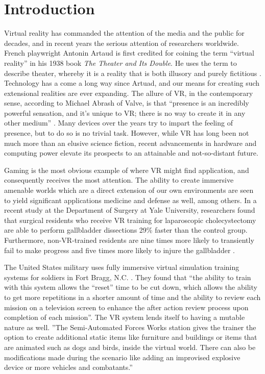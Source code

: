 \section{Introduction}
\label{sec:introduction}

Virtual reality has commanded the attention of the media and the public for
decades, and in recent years the serious attention of researchers worldwide.
French playwright Antonin Artaud is first credited for coining the term
``virtual reality'' in his 1938 book \emph{The Theater and Its Double}. He uses
the term to describe theater, whereby it is a reality that is both illusory and
purely fictitious \cite{website:popularizeVR}. Technology has a come a long way
since Artuad, and our means for creating such extensional realities are ever
expanding. The allure of VR, in the contemporary sense, according to Michael
Abrash of Valve, is that ``presence is an incredibly powerful sensation, and
it's unique to VR; there is no way to create it in any other medium''
\cite{website:steampowered}.  Many devices over the years try to impart the
feeling of presence, but to do so is no trivial task. However, while VR has
long been not much more than an elusive science fiction, recent advancements in
hardware and computing power elevate its prospects to an attainable and
not-so-distant future. 

Gaming is the most obvious example of where VR might find application, and
consequently receives the most attention.  The ability to create immersive
amenable worlds which are a direct extension of our own environments are seen
to yield significant applications medicine and defense as well, among others.
In a recent study at the Department of Surgery at Yale University, researchers
found that surgical residents who receive VR training for laparoscopic
cholecystectomy are able to perform gallbladder dissections 29\% faster than
the control group. Furthermore, non-VR-trained residents are nine times more
likely to transiently fail to make progress and five times more likely to
injure the gallbladder \cite{seymour2002virtual}.

The United States military uses fully immersive virtual simulation training
systems for soldiers in Fort Bragg, N.C. \cite{website:army}. They found that
``the ability to train with this system allows the ``reset'' time to be cut
down, which allows the ability to get more repetitions in a shorter amount of
time and the ability to review each mission on a television screen to enhance
the after action review process upon completion of each mission''.  The VR
system lends itself to having a mutable nature as well. ''The Semi-Automated
Forces Works station gives the trainer the option to create additional static
items like furniture and buildings or items that are animated such as dogs and
birds, inside the virtual world. There can also be modifications made during
the scenario like adding an improvised explosive device or more vehicles and
combatants.''

